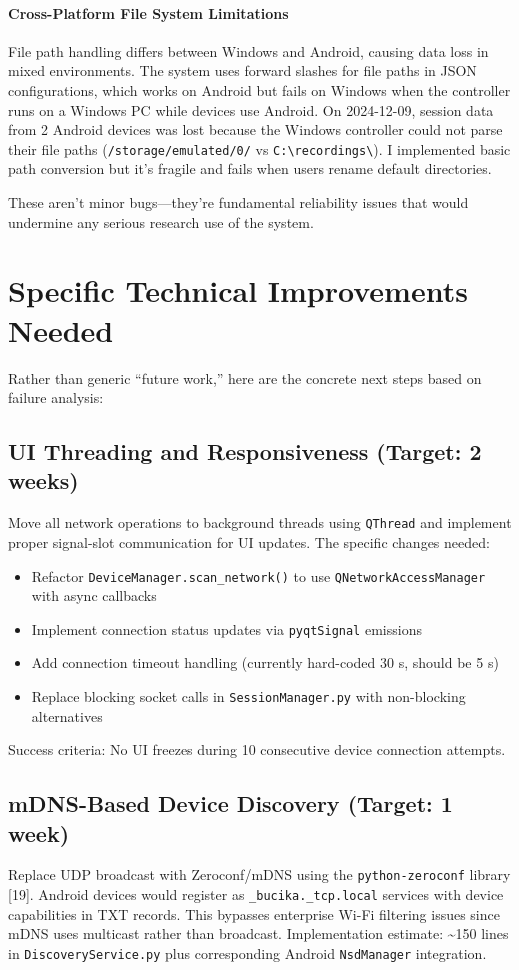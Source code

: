 \paragraph{\textbf{Cross-Platform File System Limitations}} File path handling differs between Windows and Android, causing data loss in mixed environments. The system uses forward slashes for file paths in JSON configurations, which works on Android but fails on Windows when the controller runs on a Windows PC while devices use Android. On 2024-12-09, session data from 2 Android devices was lost because the Windows controller could not parse their file paths (\verb|/storage/emulated/0/| vs \verb|C:\recordings\|). I implemented basic path conversion but it's fragile and fails when users rename default directories.

These aren't minor bugs---they're fundamental reliability issues that would undermine any serious research use of the system.

\section{Specific Technical Improvements Needed}

Rather than generic ``future work,'' here are the concrete next steps based on failure analysis:

\subsection{UI Threading and Responsiveness (Target: 2 weeks)}
Move all network operations to background threads using \texttt{QThread} and implement proper signal-slot communication for UI updates. The specific changes needed:
\begin{itemize}
  \item Refactor \texttt{DeviceManager.scan\_network()} to use \texttt{QNetworkAccessManager} with async callbacks
  \item Implement connection status updates via \texttt{pyqtSignal} emissions
  \item Add connection timeout handling (currently hard-coded 30 s, should be 5 s)
  \item Replace blocking socket calls in \texttt{SessionManager.py} with non-blocking alternatives
\end{itemize}
Success criteria: No UI freezes during 10 consecutive device connection attempts.

\subsection{mDNS-Based Device Discovery (Target: 1 week)}
Replace UDP broadcast with Zeroconf/mDNS using the \texttt{python-zeroconf} library [19]. Android devices would register as \texttt{\_bucika.\_tcp.local} services with device capabilities in TXT records. This bypasses enterprise Wi-Fi filtering issues since mDNS uses multicast rather than broadcast. Implementation estimate: \textasciitilde{}150 lines in \texttt{DiscoveryService.py} plus corresponding Android \texttt{NsdManager} integration.

